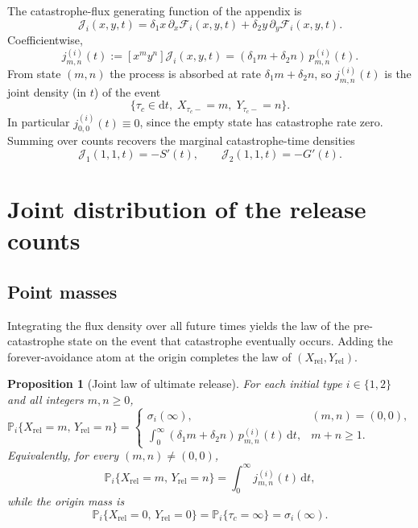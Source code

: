 \documentclass[11pt]{article}
\newcommand{\Prob}{\mathbb P}
\newcommand{\dd}{\mathrm d}
\newcommand{\Xrel}{X_{\mathrm{rel}}}
\newcommand{\Yrel}{Y_{\mathrm{rel}}}
\theoremstyle{plain}
\newtheorem{proposition}{Proposition}
\theoremstyle{definition}
\theoremstyle{remark}
\begin{document}
The catastrophe-flux generating function of the appendix is
\begin{equation}
\label{eq:flux-pgf}
\mathcal J_i(x,y,t)
=
\delta_1 x\,\partial_x\mathcal F_i(x,y,t)
+
\delta_2 y\,\partial_y\mathcal F_i(x,y,t).
\end{equation}
Coefficientwise,
\begin{equation}
\label{eq:flux-coeff}
j_{m,n}^{(i)}(t)
:=[x^my^n]\mathcal J_i(x,y,t)
=
(\delta_1 m+\delta_2 n)\,p_{m,n}^{(i)}(t).
\end{equation}
From state $(m,n)$ the process is absorbed at rate $\delta_1m+\delta_2n$, so
$j_{m,n}^{(i)}(t)$ is the joint density (in $t$) of the event
\[
\bigl\{\tau_c\in\dd t,\;
X_{\tau_c-}=m,\;
Y_{\tau_c-}=n\bigr\}.
\]
In particular $j_{0,0}^{(i)}(t)\equiv 0$, since the empty state has catastrophe rate zero.
Summing over counts recovers the marginal catastrophe-time densities
\begin{equation}
\label{eq:flux-total}
\mathcal J_1(1,1,t)=-S'(t),
\qquad
\mathcal J_2(1,1,t)=-G'(t).
\end{equation}

\section{Joint distribution of the release counts}

\subsection{Point masses}

Integrating the flux density over all future times yields the law of the pre-catastrophe state on
the event that catastrophe eventually occurs. Adding the forever-avoidance atom at the origin
completes the law of $(\Xrel,\Yrel)$.

\begin{proposition}[Joint law of ultimate release]
\label{prop:joint-pmf}
For each initial type $i\in\{1,2\}$ and all integers $m,n\ge 0$,
\begin{equation}
\label{eq:joint-pmf}
\Prob_i\{\Xrel=m,\,\Yrel=n\}
=
\begin{cases}
\displaystyle
\sigma_i(\infty),
& (m,n)=(0,0),\\[1.1em]
\displaystyle
\int_0^\infty
(\delta_1 m+\delta_2 n)\,
p_{m,n}^{(i)}(t)\,
\dd t,
& m+n\ge 1.
\end{cases}
\end{equation}
Equivalently, for every $(m,n)\neq(0,0)$,
\begin{equation}
\label{eq:joint-pmf-j}
\Prob_i\{\Xrel=m,\,\Yrel=n\}
=
\int_0^\infty j_{m,n}^{(i)}(t)\,\dd t,
\end{equation}
while the origin mass is
\begin{equation}
\label{eq:origin-mass}
\Prob_i\{\Xrel=0,\,\Yrel=0\}
=
\Prob_i\{\tau_c=\infty\}
=
\sigma_i(\infty).
\end{equation}
\end{proposition}
\end{document}
